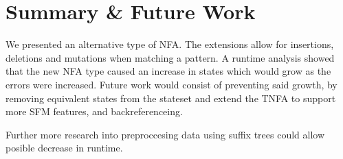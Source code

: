 \section{Summary \& Future Work}
We presented an alternative type of NFA.
The extensions allow for insertions, deletions and mutations when matching a pattern.
A runtime analysis showed that the new NFA type caused an increase in states which would grow as the errors were increased.
Future work would consist of preventing said growth, by removing equivalent states from the stateset and extend the TNFA to support more SFM features, and backreferenceing. 

Further more research into preproccesing data using suffix trees\cite{Algorithmonstring} could allow posible decrease in runtime.